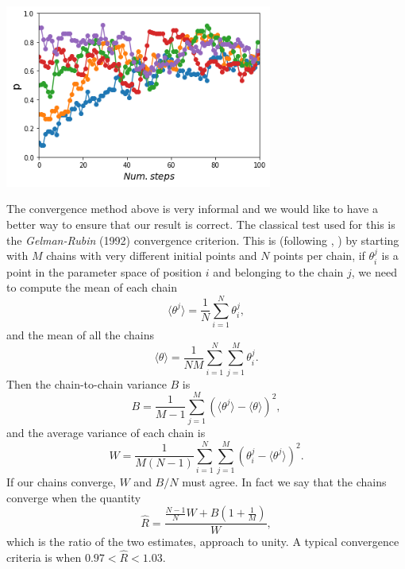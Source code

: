 \documentclass[onecolumn,           %
               showpacs,            %
               preprintnumbers,     %
               aps,                 %
               letterpaper,             %
               superscriptaddress,      %
               nofootinbib,         %
               tightenlines,        %
               floats,floatfix      %
               ,usenatbib,
               ]{revtex4-1}
\begin{document}
\begin{minipage}{\textwidth}
\centering
\includegraphics[height=6cm]{Figures/chain22.png}
\label{chain2}
\end{minipage}


The convergence method above is very informal and we would like to have a better way to ensure that our result is correct. The classical test used for this is the \textit{Gelman-Rubin} (1992) convergence criterion. This is (following \cite{LicV2}, \cite{AlanH}) by starting with $M$ chains with very different initial points and $N$ points per chain, if $\theta_i^j$ is a point in the parameter space of position $i$ and belonging to the chain $j$, we need to compute the mean of each chain 
\begin{equation}
\langle\theta^j\rangle =\frac{1}{N}\sum_{i=1}^N \theta_i^j,
\end{equation}
and the mean of all the chains
\begin{equation}
\langle\theta\rangle =\frac{1}{NM}\sum_{i=1}^N\sum_{j=1}^M\theta_i^j.
\end{equation}
Then the chain-to-chain variance $B$ is
\begin{equation}
B=\frac{1}{M-1}\sum_{j=1}^M(\langle\theta^j\rangle-\langle\theta\rangle)^2 ,
\end{equation}
and the average variance of each chain is
\begin{equation}
W=\frac{1}{M(N-1)}\sum_{i=1}^N\sum_{j=1}^M(\theta_i^j-\langle\theta^j\rangle)^2 .
\end{equation}
If our chains converge, $W$ and $B/N$ must agree. In fact we say that the chains converge when the quantity
\begin{equation}
\hat R=\frac{\frac{N-1}{N}W+B(1+\frac{1}{M})}{W},
\end{equation}
which is the ratio of the two estimates, approach to unity. A typical convergence criteria is when $0.97<\hat R<1.03$. 
\end{document}
